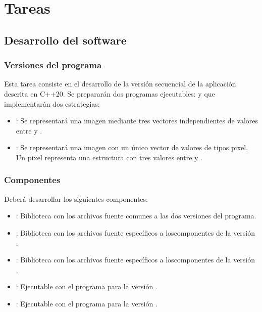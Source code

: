 \section{Tareas}

\subsection{Desarrollo del software}


\subsubsection{Versiones del programa}
\label{sec:tasks:versions}

Esta tarea consiste en el desarrollo de la versión secuencial de la
aplicación descrita en C++20. Se prepararán dos programas ejecutables:
 y  que implementarán dos
estrategias:

\begin{itemize}
  \item {}:
        Se representará una imagen mediante tres vectores independientes de valores
        entre  y .
  \item {}:
        Se representará una imagen con un único vector de valores de tipos pixel.
        Un pixel representa una estructura con tres valores entre  y
        .
\end{itemize}

\subsubsection{Componentes}

Deberá desarrollar los siguientes componentes:

\begin{itemize}
  \item {}: Biblioteca con los archivos fuente comunes
        a las dos versiones del programa.

  \item {}: Biblioteca con los archivos fuente específicos 
        a loscomponentes de la versión .

  \item {}: Biblioteca con los archivos fuente específicos 
        a loscomponentes de la versión .

  \item {}: Ejecutable con el programa para la versión .

  \item {}: Ejecutable con el programa para la versión .

\end{itemize}

